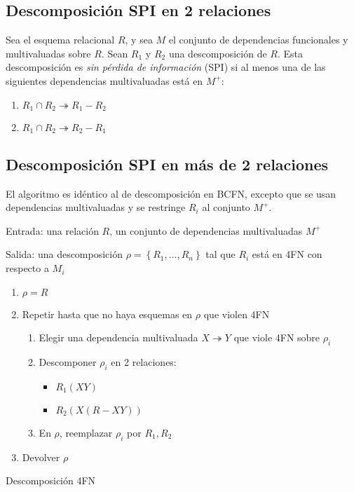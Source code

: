 \documentclass[a4paper, twoside]{article}
\begin{document}
\subsection{Descomposición SPI en 2 relaciones}
Sea el esquema relacional $R$, y sea $M$ el conjunto de dependencias funcionales y multivaluadas sobre $R$. Sean $R_{1}$ y $R_{2}$ una descomposición de $R$. Esta descomposición es \emph{sin pérdida de información} (SPI) si al menos una de las siguientes dependencias multivaluadas está en $M^{+}$:
\begin{enumerate}
	\item $R_{1}\cap R_{2}\twoheadrightarrow R_{1}-R_{2}$
	\item $R_{1}\cap R_{2}\twoheadrightarrow R_{2}-R_{1}$
\end{enumerate}

\subsection{Descomposición SPI en más de 2 relaciones}
El algoritmo es idéntico al de descomposición en BCFN, excepto que se usan dependencias multivaluadas y se restringe $R_{i}$ al conjunto $M^{+}$.

\begin{algorithm}[H]
	Entrada: una relación $R$, un conjunto de dependencias multivaluadas $M^{+}$

	Salida: una descomposición $\rho=\left\{ R_{1},\ldots,R_{n}\right\}$ tal que $R_{i}$ está en 4FN con respecto a $M_{i}$
	\begin{enumerate}
		\item $\rho=R$
		\item Repetir hasta que no haya esquemas en $\rho$ que violen 4FN
		\begin{enumerate}
			\item Elegir una dependencia multivaluada $X\twoheadrightarrow Y$ que viole 4FN sobre $\rho_{i}$
			\item Descomponer $\rho_{i}$ en 2 relaciones:
			\begin{itemize}
				\item $R_{1}\left(XY\right)$
				\item $R_{2}\left(X(R-XY)\right)$
			\end{itemize}
			\item En $\rho$, reemplazar $\rho_{i}$ por $R_{1},R_{2}$
		\end{enumerate}
		\item Devolver $\rho$
	\end{enumerate}
	\caption{Descomposición 4FN}
\end{algorithm}
\end{document}
